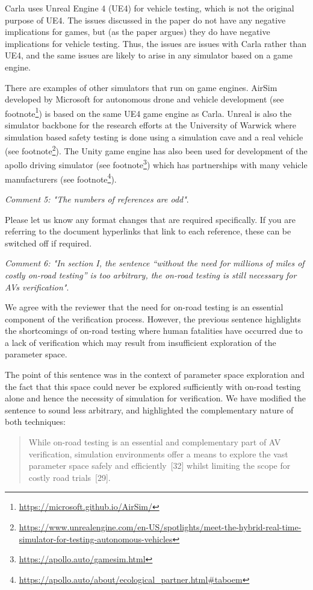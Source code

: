 \documentclass[11pt, a4paper]{letter} %
\begin{document}
\begin{letter}
Carla uses Unreal Engine 4 (UE4) for vehicle testing, which is not the original purpose of UE4. The issues discussed in the paper do not have any negative implications for games, but (as the paper argues) they do have negative implications for vehicle testing. Thus, the issues are issues with Carla rather than UE4, and the same issues are likely to arise in any simulator based on a game engine.

There are examples of other simulators that run on game engines. AirSim developed by Microsoft for autonomous drone and vehicle development (see footnote\footnote{\url{https://microsoft.github.io/AirSim/}}) is based on the same UE4 game engine as Carla. Unreal is also the simulator backbone for the research efforts at the University of Warwick where simulation based safety testing is done using a simulation cave and a real vehicle (see footnote\footnote{\url{https://www.unrealengine.com/en-US/spotlights/meet-the-hybrid-real-time-simulator-for-testing-autonomous-vehicles}}). The Unity game engine has also been used for development of the apollo driving simulator (see footnote\footnote{\url{https://apollo.auto/gamesim.html}}) which has partnerships with many vehicle manufacturers (see footnote\footnote{\url{https://apollo.auto/about/ecological\_partner.html#taboem}}).


\bigskip


\textit{Comment 5: "The numbers of references are odd"}.

Please let us know any format changes that are required specifically. If you are referring to the document hyperlinks that link to each reference, these can be switched off if required.


\bigskip


\textit{Comment 6: "In section I, the sentence “without the need for millions of miles of costly on-road testing” is too arbitrary, the on-road testing is still necessary for AVs verification"}.

We agree with the reviewer that the need for on-road testing is an essential component of the verification process. However, the previous sentence highlights the shortcomings of on-road testing where human fatalities have occurred due to a lack of verification which may result from insufficient exploration of the parameter space.

The point of this sentence  was in the context of parameter space exploration and the fact that this space could never be explored sufficiently with on-road testing alone and hence the necessity of simulation for verification. We have modified the sentence to sound less arbitrary, and highlighted the complementary nature of both techniques:
\begin{quote}
While on-road testing is an essential and complementary part of AV verification, simulation environments offer a means to explore the vast parameter space safely and efficiently~[32] whilst limiting the scope for costly road trials~[29].
\end{quote}


\end{letter}
\end{document}
